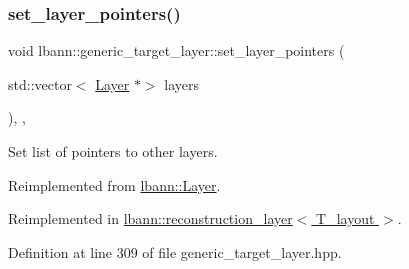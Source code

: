 \subsubsection{\texorpdfstring{set\+\_\+layer\+\_\+pointers()}{set\_layer\_pointers()}}
{\footnotesize\ttfamily void lbann\+::generic\+\_\+target\+\_\+layer\+::set\+\_\+layer\+\_\+pointers (\begin{DoxyParamCaption}\item[{std\+::vector$<$ \hyperlink{classlbann_1_1Layer}{Layer} $\ast$$>$}]{layers }\end{DoxyParamCaption})\hspace{0.3cm}{\ttfamily [inline]}, {\ttfamily [override]}, {\ttfamily [virtual]}}

Set list of pointers to other layers. 

Reimplemented from \hyperlink{classlbann_1_1Layer_a001ea76cdd05e2d0d475f408f24702ee}{lbann\+::\+Layer}.



Reimplemented in \hyperlink{classlbann_1_1reconstruction__layer_a663b2810780ee2b0817f611a00b0b07f}{lbann\+::reconstruction\+\_\+layer$<$ T\+\_\+layout $>$}.



Definition at line 309 of file generic\+\_\+target\+\_\+layer.\+hpp.


